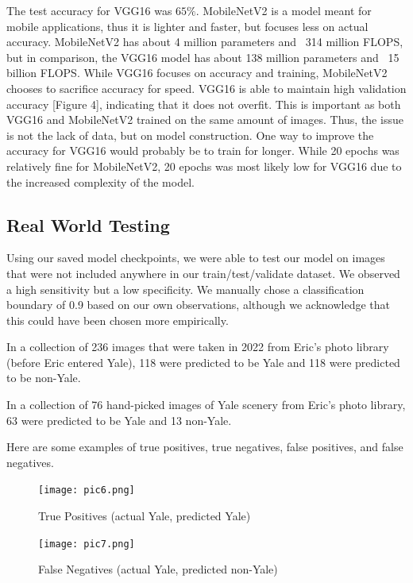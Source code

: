 \documentclass[letterpaper]{article} %
\begin{document}
The test accuracy for VGG16 was $65\%$. MobileNetV2 is a model meant for mobile applications, thus it is lighter and faster, but focuses less on actual accuracy. MobileNetV2 has about 4 million parameters and ~314 million FLOPS, but in comparison, the VGG16 model has about 138 million parameters and ~15 billion FLOPS. While VGG16 focuses on accuracy and training, MobileNetV2 chooses to sacrifice accuracy for speed. VGG16 is able to maintain high validation accuracy [Figure 4], indicating that it does not overfit. This is important as both VGG16 and MobileNetV2 trained on the same amount of images. Thus, the issue is not the lack of data, but on model construction. One way to improve the accuracy for VGG16 would probably be to train for longer. While 20 epochs was relatively fine for MobileNetV2, 20 epochs was most likely low for VGG16 due to the increased complexity of the model.


\subsection{Real World Testing}

Using our saved model checkpoints, we were able to test our model on images that were not included anywhere in our train/test/validate dataset. We observed a high sensitivity but a low specificity. We manually chose a classification boundary of 0.9 based on our own observations, although we acknowledge that this could have been chosen more empirically.

In a collection of 236 images that were taken in 2022 from Eric’s photo library (before Eric entered Yale), 118 were predicted to be Yale and 118 were predicted to be non-Yale.

In a collection of 76 hand-picked images of Yale scenery from Eric’s photo library, 63 were predicted to be Yale and 13 non-Yale.

Here are some examples of true positives, true negatives, false positives, and false negatives.
\begin{figure}
    \centering
    \texttt{[image: pic6.png]}
    \caption{True Positives (actual Yale, predicted Yale)}
    \label{fig:enter-label}
\end{figure}

\begin{figure}
    \centering
    \texttt{[image: pic7.png]}
    \caption{False Negatives (actual Yale, predicted non-Yale)}
    \label{fig:enter-label}
\end{figure}
\end{document}
